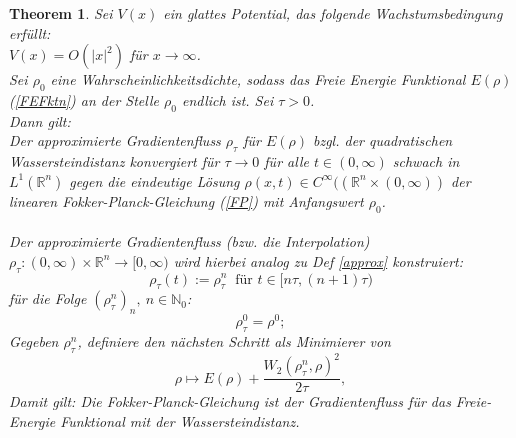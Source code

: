 \documentclass[11pt,a4paper,notitlepage]{scrreprt}
\newcommand{\RR}{\mathbb{R}}
\newcommand{\NN}{\mathbb{N}}
\newtheorem{theorem}[defi]{Theorem}
\begin{document}
\begin{theorem}
Sei $V(x)$ ein glattes Potential, das folgende Wachstumsbedingung erfüllt: \\$V(x)=O(\vert x \vert^2)$ für $x\to\infty$. \\
Sei $\rho_0$ eine Wahrscheinlichkeitsdichte, sodass das Freie Energie Funktional $E(\rho)$ (\ref{FEFktn}) an der Stelle $\rho_0$ endlich ist. Sei $\tau>0$.\\
Dann gilt: \\
Der approximierte Gradientenfluss $\rho_\tau$  für $E(\rho)$ bzgl. der quadratischen Wassersteindistanz konvergiert für $\tau\to 0$ für alle $t\in(0,\infty)$ schwach in $L^1(\RR^n)$ gegen die eindeutige Lösung $\rho(x,t)\in C^\infty((\RR^n\times(0,\infty))$ der linearen Fokker-Planck-Gleichung (\ref{FP}) mit Anfangswert $\rho_0$.\\\\
Der approximierte Gradientenfluss (bzw. die Interpolation) $\rho_\tau:(0,\infty)\times\RR^n\to[0,\infty)$ wird hierbei analog zu Def \ref{approx} konstruiert:
\begin{equation}
\rho_\tau(t):=\rho_\tau^n ~\text{ für }t\in[n\tau,(n+1)\tau)
\end{equation}
für die Folge $(\rho_\tau^n)_n,~n\in\NN_0$:
\[\rho_\tau^0=\rho^0; \]
Gegeben $\rho_\tau^n$, definiere den nächsten Schritt als Minimierer von
\begin{equation} \rho \mapsto E(\rho)+\dfrac{W_2(\rho_\tau^n,\rho)^2}{2\tau}, \label{rho^n}
\end{equation}
Damit gilt: Die Fokker-Planck-Gleichung ist der Gradientenfluss für das Freie-Energie Funktional mit der Wassersteindistanz.
\end{theorem}
\end{document}
